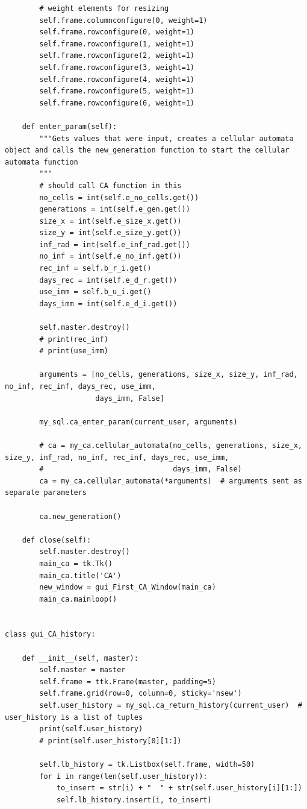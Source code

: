 \documentclass[11pt, a4paper]{article}
\begin{document}
\begin{lstlisting}
        # weight elements for resizing
        self.frame.columnconfigure(0, weight=1)
        self.frame.rowconfigure(0, weight=1)
        self.frame.rowconfigure(1, weight=1)
        self.frame.rowconfigure(2, weight=1)
        self.frame.rowconfigure(3, weight=1)
        self.frame.rowconfigure(4, weight=1)
        self.frame.rowconfigure(5, weight=1)
        self.frame.rowconfigure(6, weight=1)

    def enter_param(self):
        """Gets values that were input, creates a cellular automata object and calls the new_generation function to start the cellular automata function
        """
        # should call CA function in this
        no_cells = int(self.e_no_cells.get())
        generations = int(self.e_gen.get())
        size_x = int(self.e_size_x.get())
        size_y = int(self.e_size_y.get())
        inf_rad = int(self.e_inf_rad.get())
        no_inf = int(self.e_no_inf.get())
        rec_inf = self.b_r_i.get()
        days_rec = int(self.e_d_r.get())
        use_imm = self.b_u_i.get()
        days_imm = int(self.e_d_i.get())

        self.master.destroy()
        # print(rec_inf)
        # print(use_imm)

        arguments = [no_cells, generations, size_x, size_y, inf_rad, no_inf, rec_inf, days_rec, use_imm,
                     days_imm, False]

        my_sql.ca_enter_param(current_user, arguments)

        # ca = my_ca.cellular_automata(no_cells, generations, size_x, size_y, inf_rad, no_inf, rec_inf, days_rec, use_imm,
        #                              days_imm, False)
        ca = my_ca.cellular_automata(*arguments)  # arguments sent as separate parameters

        ca.new_generation()

    def close(self):
        self.master.destroy()
        main_ca = tk.Tk()
        main_ca.title('CA')
        new_window = gui_First_CA_Window(main_ca)
        main_ca.mainloop()


class gui_CA_history:

    def __init__(self, master):
        self.master = master
        self.frame = ttk.Frame(master, padding=5)
        self.frame.grid(row=0, column=0, sticky='nsew')
        self.user_history = my_sql.ca_return_history(current_user)  # user_history is a list of tuples
        print(self.user_history)
        # print(self.user_history[0][1:])

        self.lb_history = tk.Listbox(self.frame, width=50)
        for i in range(len(self.user_history)):
            to_insert = str(i) + "  " + str(self.user_history[i][1:])
            self.lb_history.insert(i, to_insert)


\end{lstlisting}
\end{document}
